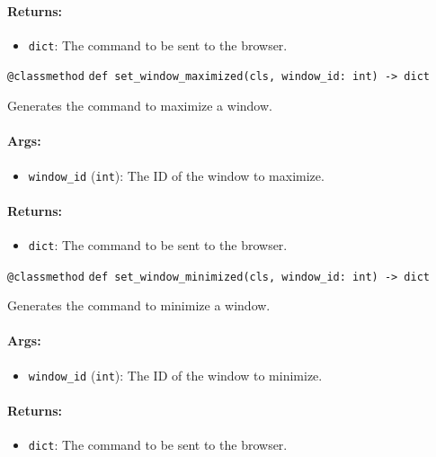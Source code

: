\documentclass{article}
\begin{document}
\paragraph{Returns:}
\begin{itemize}
    \item \texttt{dict}: The command to be sent to the browser.
\end{itemize}

\noindent\texttt{@classmethod}
\noindent\texttt{def set\_window\_maximized(cls, window\_id: int) -> dict}

\noindent Generates the command to maximize a window.

\paragraph{Args:}
\begin{itemize}
    \item \texttt{window\_id} (\texttt{int}): The ID of the window to maximize.
\end{itemize}

\paragraph{Returns:}
\begin{itemize}
    \item \texttt{dict}: The command to be sent to the browser.
\end{itemize}

\noindent\texttt{@classmethod}
\noindent\texttt{def set\_window\_minimized(cls, window\_id: int) -> dict}

\noindent Generates the command to minimize a window.

\paragraph{Args:}
\begin{itemize}
    \item \texttt{window\_id} (\texttt{int}): The ID of the window to minimize.
\end{itemize}

\paragraph{Returns:}
\begin{itemize}
    \item \texttt{dict}: The command to be sent to the browser.
\end{itemize}
\end{document}
